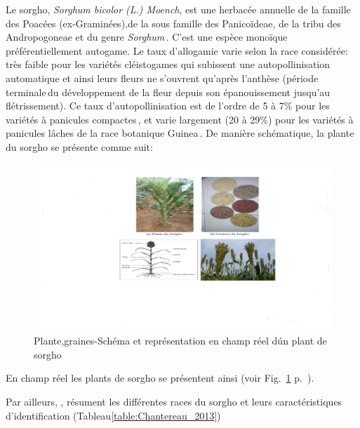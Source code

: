 \documentclass[a4paper,11pt]{article}
\begin{document}
Le sorgho, \emph{Sorghum bicolor (L.) Moench}, est une herbacée
annuelle de la famille des Poacées (ex-Graminées),de la sous famille
des Panicoïdeae, de la tribu des Andropogoneae et du genre
\emph{Sorghum}\,\cite{Doggett_1988}.  C’est une espèce monoïque
préférentiellement autogame. Le taux d’allogamie varie selon la race
considérée: très faible pour les variétés cléistogames qui subissent
une autopollinisation automatique et ainsi leurs fleurs ne s’ouvrent
qu’après l’anthèse (période terminale\,du développement de la fleur
depuis son épanouissement jusqu’au flétrissement). Ce taux
d'autopollinisation est de l’ordre de 5 à 7\% pour les variétés à
panicules compactes\,\cite{Doggett_1988}, et varie largement (20 à
29\%) pour les variétés à panicules lâches de la race botanique
Guinea\,\cite{Ollitrault_1987,Chantereau_1994}. De manière
schématique, la plante du sorgho se présente comme suit:


 
\begin{figure}%
  \begin{center}
    \includegraphics[width=16cm]{images/SchemaComposePage5}
  \end{center}
  \caption{Plante,graines-Schéma et représentation en champ réel d\'un plant de sorgho}
   \label{fig-SchemaComposePage5}
\end{figure}

En champ réel les plants de sorgho se présentent ainsi (voir
Fig.~\ref{fig-SchemaComposePage5}
p.~\pageref{fig-SchemaComposePage5}).


Par ailleurs, , résument les différentes races du sorgho et
leurs caractéristiques d'identification (Tableau\ref{table:Chantereau_2013})
\end{document}
